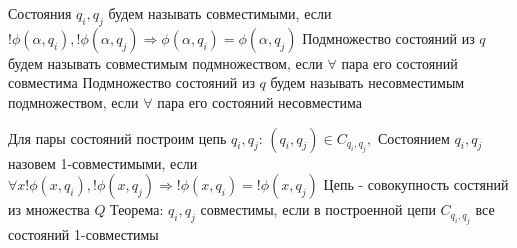 \documentclass[a5paper,10pt]{article}
\begin{document}
				Состояния $q_i,q_j$ будем называть совместимыми, если $!\phi(\alpha,q_i),!\phi(\alpha,q_j) \Rightarrow \phi(\alpha,q_i)=\phi(\alpha,q_j)$
				Подмножество состояний из $q$ будем называть совместимым подмножеством, если $\forall$ пара его состояний совместима
				Подмножество состояний из $q$ будем называть несовместимым подмножеством, если $\forall$ пара его состояний несовместима

				Для пары состояний построим цепь $q_i,q_j$:
				$(q_i,q_j) \in C_{q_i,q_j},$
				Состоянием $q_i,q_j$ назовем 1-совместимыми, если $\forall x !\phi(x,q_i), !\phi(x,q_j) \Rightarrow !\phi(x,q_i)=!\phi(x,q_j)$
				Цепь - совокупность состяний из множества $Q$
				Теорема: $q_i,q_j$ совместимы, если в построенной цепи $C_{q_i,q_j}$ все состояний 1-совместимы
\end{document}
